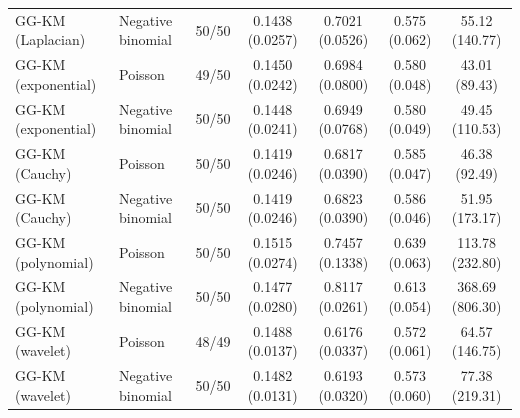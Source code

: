\begin{table}[tbp]
\begin{tabular}{llccccc}
GG-KM (Laplacian)
& Negative binomial
& 50/50
& 0.1438 (0.0257)
& 0.7021 (0.0526)
& 0.575 (0.062)
& 55.12 (140.77) \\

GG-KM (exponential)
& Poisson
& 49/50
& 0.1450 (0.0242)
& 0.6984 (0.0800)
& 0.580 (0.048)
& 43.01 (89.43) \\

GG-KM (exponential)
& Negative binomial
& 50/50
& 0.1448 (0.0241)
& 0.6949 (0.0768)
& 0.580 (0.049)
& 49.45 (110.53) \\

GG-KM (Cauchy)
& Poisson
& 50/50
& 0.1419 (0.0246)
& 0.6817 (0.0390)
& 0.585 (0.047)
& 46.38 (92.49) \\

GG-KM (Cauchy)
& Negative binomial
& 50/50
& 0.1419 (0.0246)
& 0.6823 (0.0390)
& 0.586 (0.046)
& 51.95 (173.17) \\

GG-KM (polynomial)
& Poisson
& 50/50
& 0.1515 (0.0274)
& 0.7457 (0.1338)
& 0.639 (0.063)
& 113.78 (232.80) \\

GG-KM (polynomial)
& Negative binomial
& 50/50
& 0.1477 (0.0280)
& 0.8117 (0.0261)
& 0.613 (0.054)
& 368.69 (806.30) \\

GG-KM (wavelet)
& Poisson
& 48/49
& 0.1488 (0.0137)
& 0.6176 (0.0337)
& 0.572 (0.061)
& 64.57 (146.75) \\

GG-KM (wavelet)
& Negative binomial
& 50/50
& 0.1482 (0.0131)
& 0.6193 (0.0320)
& 0.573 (0.060)
& 77.38 (219.31) \\

\hline
\end{tabular}
\end{table}
